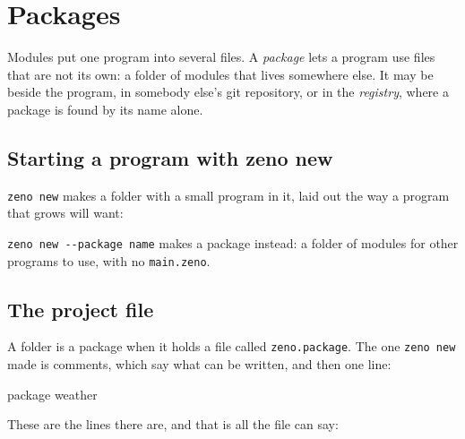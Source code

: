 \chapter{Packages}\label{ch-packages}

Modules put one program into several files. A \emph{package} lets a
program use files that are not its own: a folder of modules that lives
somewhere else. It may be beside the program, in somebody else's git
repository, or in the \emph{registry}, where a package is found by
its name alone.

\section{Starting a program with zeno new}

\verb|zeno new| makes a folder with a small program in it, laid out
the way a program that grows will want:


\verb|zeno new --package name| makes a package instead: a folder of
modules for other programs to use, with no \verb|main.zeno|.

\section{The project file}

A folder is a package when it holds a file called
\verb|zeno.package|. The one \verb|zeno new| made is comments, which say
what can be written, and then one line:

\begin{zeno}[file=weather/zeno.package, dir=new, run=no]
package weather
\end{zeno}

These are the lines there are, and that is all the file can say:


